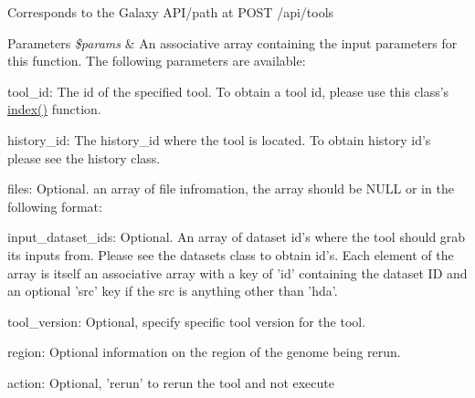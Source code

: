 Corresponds to the Galaxy A\-P\-I/path at P\-O\-S\-T /api/tools


\begin{DoxyParams}{Parameters}
{\em \$params} & An associative array containing the input parameters for this function. The following parameters are available\-:\\
\hline
\end{DoxyParams}

\begin{DoxyItemize}
\item tool\-\_\-id\-: The id of the specified tool. To obtain a tool id, please use this class's \hyperlink{classGalaxyTools_af40fb7ab4bcad2ccb82b2f0c292d3a0d}{index()} function.
\item history\-\_\-id\-: The history\-\_\-id where the tool is located. To obtain history id's please see the history class.
\item files\-: Optional. an array of file infromation, the array should be N\-U\-L\-L or in the following format\-: 

\end{DoxyItemize}

input\-\_\-dataset\-\_\-ids\-: Optional. An array of dataset id's where the tool should grab its inputs from. Please see the datasets class to obtain id's. Each element of the array is itself an associative array with a key of 'id' containing the dataset I\-D and an optional 'src' key if the src is anything other than 'hda'.
\begin{DoxyItemize}
\item tool\-\_\-version\-: Optional, specify specific tool version for the tool.
\item region\-: Optional information on the region of the genome being rerun.
\item action\-: Optional, 'rerun' to rerun the tool and not execute
\end{DoxyItemize}

